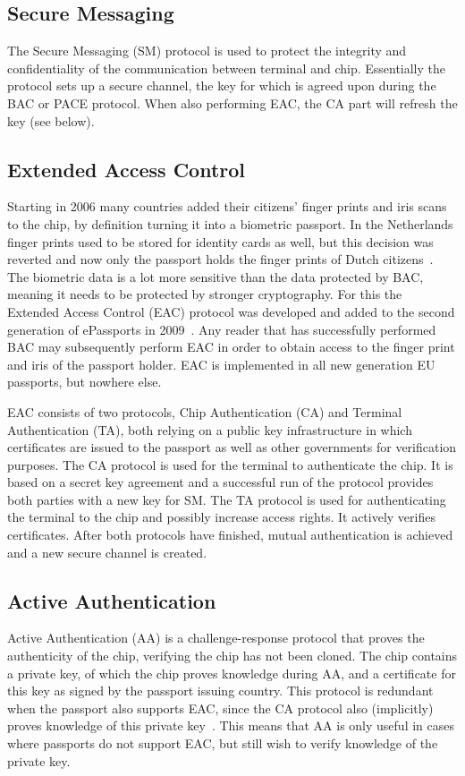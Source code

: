 \subsection{Secure Messaging}
The Secure Messaging (SM) protocol is used to protect the integrity and confidentiality of the communication between terminal and chip. Essentially the protocol sets up a secure channel, the key for which is agreed upon during the BAC or PACE protocol. When also performing EAC, the CA part will refresh the key (see below).

\subsection{Extended Access Control}
Starting in 2006 many countries added their citizens' finger prints and iris scans to the chip, by definition turning it into a biometric passport. In the Netherlands finger prints used to be stored for identity cards as well, but this decision was reverted and now only the passport holds the finger prints of Dutch citizens~\cite{idkaart}. The biometric data is a lot more sensitive than the data protected by BAC, meaning it needs to be protected by stronger cryptography. For this the Extended Access Control (EAC) protocol was developed and added to the second generation of ePassports in 2009~\cite{gemalto}. Any reader that has successfully performed BAC may subsequently perform EAC in order to obtain access to the finger print and iris of the passport holder. EAC is implemented in all new generation EU passports, but nowhere else.

EAC consists of two protocols, Chip Authentication (CA) and Terminal Authentication (TA), both relying on a public key infrastructure in which certificates are issued to the passport as well as other governments for verification purposes. The CA protocol is used for the terminal to authenticate the chip. It is based on a secret key agreement and a successful run of the protocol provides both parties with a new key for SM. The TA protocol is used for authenticating the terminal to the chip and possibly increase access rights. It actively verifies certificates. After both protocols have finished, mutual authentication is achieved and a new secure channel is created.

\subsection{Active Authentication}
Active Authentication (AA) is a challenge-response protocol that proves the authenticity of the chip, verifying the chip has not been cloned. The chip contains a private key, of which the chip proves knowledge during AA, and a certificate for this key as signed by the passport issuing country. This protocol is redundant when the passport also supports EAC, since the CA protocol also (implicitly) proves knowledge of this private key~\cite{secprivepassport}. This means that AA is only useful in cases where passports do not support EAC, but still wish to verify knowledge of the private key.

